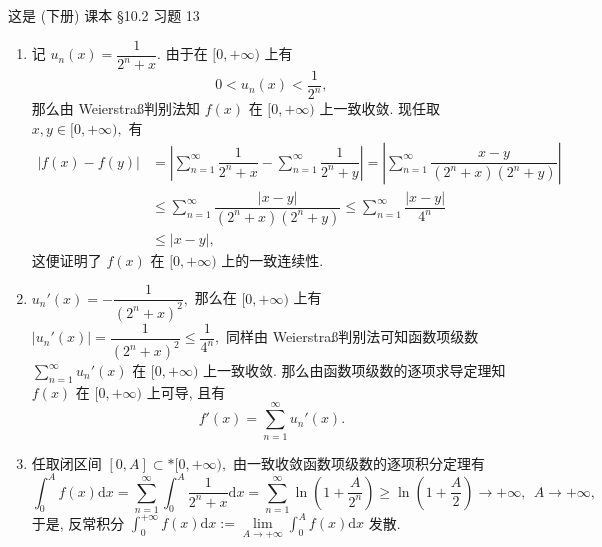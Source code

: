 \begin{solution}
这是 (下册) 课本 \S 10.2 习题 13

\begin{enumerate}
\item 记 $u_n(x) = \dfrac{1}{2^n + x}.$ 由于在 $[0, +\infty)$ 上有
$$0 < u_n(x) < \dfrac{1}{2^n},$$
那么由 Weierstra\ss 判别法知 $f(x)$ 在 $[0, +\infty)$ 上一致收敛. 现任取 $x, y \in [0, +\infty),$ 有
\begin{align*}
  \lvert f(x) - f(y) \rvert & = \left\lvert \sum\limits_{n=1}^\infty \dfrac{1}{2^n + x} - \sum\limits_{n=1}^\infty \dfrac{1}{2^n + y} \right\rvert = \left\lvert \sum\limits_{n=1}^\infty \dfrac{x - y}{(2^n + x)(2^n + y)} \right\rvert \\
  & \leqslant \sum\limits_{n=1}^\infty \dfrac{\lvert x - y \rvert}{(2^n + x)(2^n + y)} \leqslant \sum\limits_{n=1}^\infty \dfrac{\lvert x - y \rvert}{4^n} \\
  & \leqslant \lvert x - y \rvert,
\end{align*}
这便证明了 $f(x)$ 在 $[0, +\infty)$ 上的一致连续性.
\item $u_n'(x) = -\dfrac{1}{\left(2^n + x\right)^2},$ 那么在 $[0, +\infty)$ 上有 $\lvert u_n'(x) \rvert = \dfrac{1}{\left(2^n + x\right)^2} \leqslant \dfrac{1}{4^n},$ 同样由 Weierstra\ss 判别法可知函数项级数 $\sum\limits_{n=1}^\infty u_n'(x)$ 在 $[0, +\infty)$ 上一致收敛. 那么由函数项级数的逐项求导定理知 $f(x)$ 在 $[0, +\infty)$ 上可导, 且有
$$f'(x) = \sum\limits_{n=1}^\infty u_n'(x).$$
\item 任取闭区间 $[0, A] \subset* [0, +\infty),$ 由一致收敛函数项级数的逐项积分定理有
$$\int_0^{A} f(x) \mathrm{d} x = \sum\limits_{n=1}^\infty \int_0^{A} \dfrac{1}{2^n + x} \mathrm{d} x = \sum\limits_{n=1}^\infty \ln \left( 1 + \dfrac{A}{2^n} \right) \geqslant \ln \left( 1 + \dfrac{A}{2} \right) \to +\infty, ~~ A \to +\infty,$$
于是, 反常积分 $\int_0^{+\infty} f(x) \mathrm{d} x := \lim\limits_{A \to +\infty} \int_0^{A} f(x) \mathrm{d} x$ 发散.
\end{enumerate}
\end{solution}

